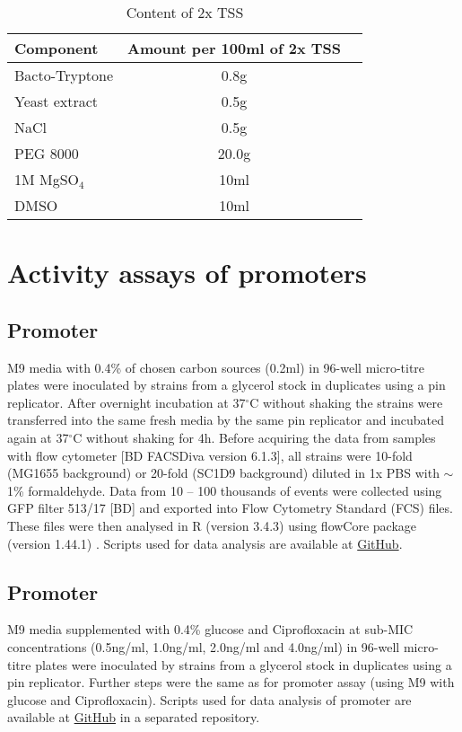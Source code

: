 \begin{center}
	\begin{longtable}[c]{|l|c|c|}
\caption{Content of 2x TSS} \label{tss} \\

\toprule \multicolumn{1}{|l|}{\textbf{Component}} & \multicolumn{1}{c|}{\textbf{Amount per 100ml of 2x TSS}} \\
\midrule
\endhead

\bottomrule
\endlastfoot

Bacto-Tryptone & 0.8g \\
\hline
Yeast extract & 0.5g \\
\hline
NaCl & 0.5g \\
\hline
PEG 8000 & 20.0g \\
\hline
1M MgSO$_{4}$ & 10ml \\
\hline
DMSO & 10ml \\
	\end{longtable}
\end{center}


\section{Activity assays of promoters}
\subsection{Promoter }
M9 media with 0.4\% of chosen carbon sources (0.2ml) in 96-well micro-titre plates were inoculated by strains from a glycerol stock in duplicates using a pin replicator.
After overnight incubation at 37$^{\circ}$C without shaking the strains were transferred into the same fresh media by the same pin replicator and incubated again at 37$^{\circ}$C without shaking for 4h.
Before acquiring the data from samples with flow cytometer [BD FACSDiva version 6.1.3], all strains were 10-fold (MG1655 background) or 20-fold (SC1\textunderscore D9 background) diluted in 1x PBS with $\sim$1\% formaldehyde.
Data from 10 -- 100 thousands of events were collected using GFP filter 513/17 [BD] and exported into Flow Cytometry Standard (FCS) files.
These files were then analysed in R (version 3.4.3) using flowCore package (version 1.44.1) \cite{hahne2009flowcore}.
Scripts used for data analysis are available at \href{https://github.com/marketavlkova/LacZ_FC}{GitHub}.

\subsection{Promoter }
M9 media supplemented with 0.4\% glucose and Ciprofloxacin at sub-MIC concentrations (0.5ng/ml, 1.0ng/ml, 2.0ng/ml and 4.0ng/ml) in 96-well micro-titre plates were inoculated by strains from a glycerol stock in duplicates using a pin replicator.
Further steps were the same as for  promoter assay (using M9 with glucose and Ciprofloxacin).
Scripts used for data analysis of  promoter are available at \href{https://github.com/marketavlkova/RecA}{GitHub} in a separated repository.


